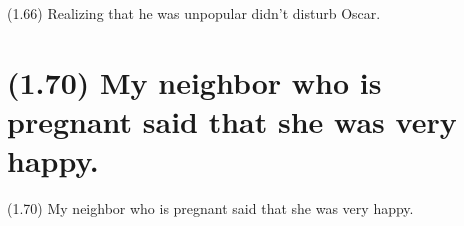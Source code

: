 \documentclass{article}
\begin{document}
\bigbreak
\begin{enumerate*}
\item[(1.66)] Realizing that he was unpopular didn't disturb Oscar.
\end{enumerate*}
\bigbreak

\bigbreak
\begin{minipage}{\textwidth}
\end{minipage}
\bigbreak

\clearpage

%
%

\section*{(1.70) My neighbor who is pregnant said that she was very happy.}

\bigbreak
\begin{enumerate*}
\item[(1.70)] My neighbor who is pregnant said that she was very happy.
\end{enumerate*}
\bigbreak
\end{document}

